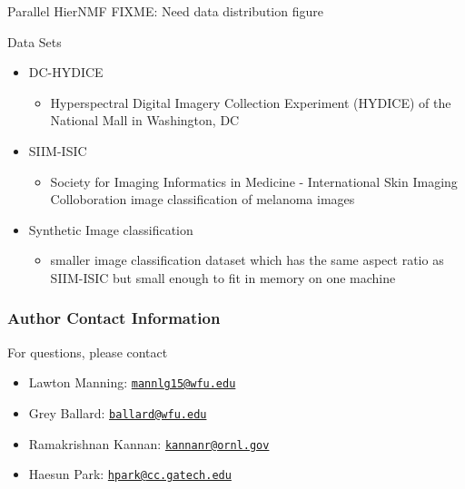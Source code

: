 \documentclass{beamer}
\newcommand{\email}[1]{\href{mailto:#1}{\texttt{#1}}}
\begin{document}
\begin{frame}{Parallel HierNMF}
    FIXME: Need data distribution figure
\end{frame}

\begin{frame}{Data Sets}
    \begin{itemize}
        \item DC-HYDICE
        \begin{itemize}
            \item Hyperspectral Digital Imagery Collection Experiment (HYDICE) of the National Mall in Washington, DC
        \end{itemize}
        \item SIIM-ISIC
        \begin{itemize}
            \item Society for Imaging Informatics in Medicine - International Skin Imaging Colloboration image classification of melanoma images
        \end{itemize}
        \item Synthetic Image classification
        \begin{itemize}
            \item smaller image classification dataset which has the same aspect ratio as SIIM-ISIC but small enough to fit in memory on one machine
        \end{itemize}
    \end{itemize}
\end{frame}

\begin{frame}
\frametitle{Author Contact Information}

For questions, please contact
\begin{itemize}
	\item Lawton Manning: \email{mannlg15@wfu.edu}
	\item Grey Ballard: \email{ballard@wfu.edu}
	\item Ramakrishnan Kannan: \email{kannanr@ornl.gov}
	\item Haesun Park: \email{hpark@cc.gatech.edu}
\end{itemize}

\end{frame}
\end{document}
